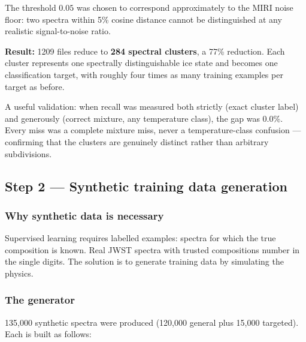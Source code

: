 \documentclass[11pt,a4paper]{article}
\begin{document}
The threshold $0.05$ was chosen to correspond approximately to the MIRI
noise floor: two spectra within 5\% cosine distance cannot be
distinguished at any realistic signal-to-noise ratio.

\begin{goodbox}
\textbf{Result:} 1209 files reduce to \textbf{284 spectral clusters}, a
77\% reduction. Each cluster represents one spectrally distinguishable ice
state and becomes one classification target, with roughly four times as
many training examples per target as before.
\end{goodbox}

A useful validation: when recall was measured both strictly (exact cluster
label) and generously (correct mixture, any temperature class), the gap was
0.0\%. Every miss was a complete mixture miss, never a temperature-class
confusion --- confirming that the clusters are genuinely distinct rather
than arbitrary subdivisions.

\subsection{Step 2 --- Synthetic training data generation}

\subsubsection*{Why synthetic data is necessary}

Supervised learning requires labelled examples: spectra for which the true
composition is known. Real JWST spectra with trusted compositions number in
the single digits. The solution is to generate training data by simulating
the physics.

\subsubsection*{The generator}

135{,}000 synthetic spectra were produced (120{,}000 general plus 15{,}000
targeted). Each is built as follows:
\end{document}
